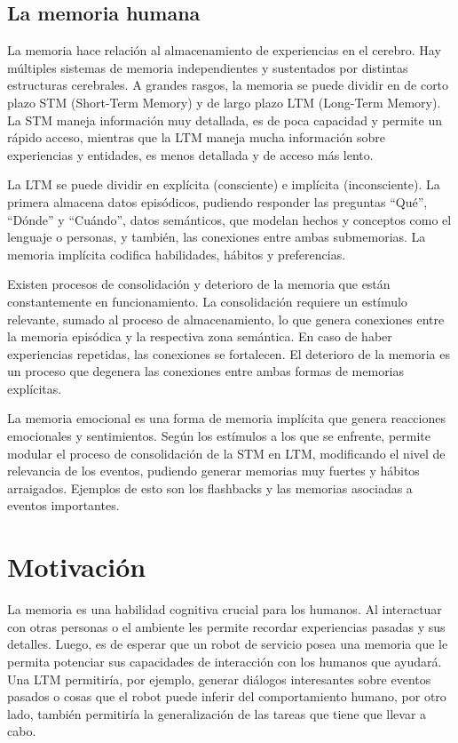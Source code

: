 \subsection{La memoria humana}

La memoria hace relación al almacenamiento de experiencias en el cerebro. Hay múltiples sistemas de memoria independientes y sustentados por distintas estructuras cerebrales. A grandes rasgos, la memoria se puede dividir en de corto plazo STM (Short-Term Memory) y de largo plazo LTM (Long-Term Memory). La STM maneja información muy detallada, es de poca capacidad y permite un rápido acceso, mientras que la LTM maneja mucha información sobre experiencias y entidades, es menos detallada y de acceso más lento\cite{Eichenbaum:2008}.

La LTM se puede dividir en explícita (consciente) e implícita (inconsciente). La primera almacena datos episódicos, pudiendo responder las preguntas ``Qué'', ``Dónde'' y ``Cuándo'', datos semánticos, que modelan hechos y conceptos como el lenguaje o personas, y también, las conexiones entre ambas submemorias. La memoria implícita codifica habilidades, hábitos y preferencias.

Existen procesos de consolidación y deterioro de la memoria que están constantemente en funcionamiento. La consolidación requiere un estímulo relevante, sumado al proceso de almacenamiento, lo que genera conexiones entre la memoria episódica y la respectiva zona semántica. En caso de haber experiencias repetidas, las conexiones se fortalecen. El deterioro de la memoria es un proceso que degenera las conexiones entre ambas formas de memorias explícitas.

La memoria emocional es una forma de memoria implícita que genera reacciones emocionales y sentimientos. Según los estímulos a los que se enfrente, permite modular el proceso de consolidación de la STM en LTM, modificando el nivel de relevancia de los eventos, pudiendo generar memorias muy fuertes y hábitos arraigados. Ejemplos de esto son los flashbacks y las memorias asociadas a eventos importantes.



\section{Motivación}

La memoria es una habilidad cognitiva crucial para los humanos. Al interactuar con otras personas o el ambiente les permite recordar experiencias pasadas y sus detalles. Luego, es de esperar que un robot de servicio posea una memoria que le permita potenciar sus capacidades de interacción con los humanos que ayudará\cite{Vijayakumar2014}. Una LTM permitiría, por ejemplo, generar diálogos interesantes sobre eventos pasados o cosas que el robot puede inferir del comportamiento humano, por otro lado, también permitiría la generalización de las tareas que tiene que llevar a cabo.

